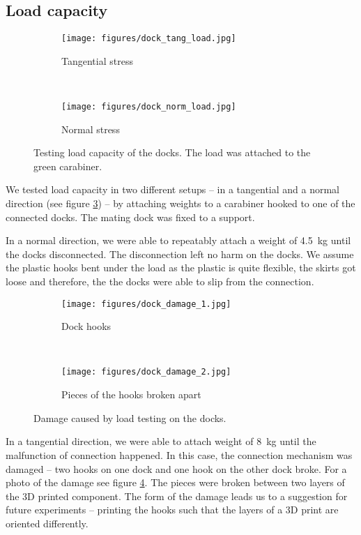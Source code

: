 \subsection{Load capacity}

\begin{figure}[t!]
    \centering
    \begin{subfigure}[b]{0.45\textwidth}
        \texttt{[image: figures/dock\_tang\_load.jpg]}
        \caption{Tangential stress}
        \label{fig:dock_test_tang}
    \end{subfigure}
    ~
    \begin{subfigure}[b]{0.45\textwidth}
        \texttt{[image: figures/dock\_norm\_load.jpg]}
        \caption{Normal stress}
        \label{fig:dock_test_norm}
    \end{subfigure}
    \caption{Testing load capacity of the docks. The load was attached to the
    green carabiner.}
    \label{fig:dock_test_load}
\end{figure}

We tested load capacity in two different setups -- in a tangential and a normal
direction (see figure \ref{fig:dock_test_load}) -- by attaching weights to a
carabiner hooked to one of the connected docks. The mating dock was fixed to a
support.

In a normal direction, we were able to repeatably attach a weight of 4.5~kg
until the docks disconnected. The disconnection left no harm on the docks. We
assume the plastic hooks bent under the load as the plastic is quite flexible,
the skirts got loose and therefore, the the docks were able to slip from the
connection.

\begin{figure}[t!]
    \centering
    \begin{subfigure}[b]{0.45\textwidth}
        \texttt{[image: figures/dock\_damage\_1.jpg]}
        \caption{Dock hooks}
    \end{subfigure}
    ~
    \begin{subfigure}[b]{0.45\textwidth}
        \texttt{[image: figures/dock\_damage\_2.jpg]}
        \caption{Pieces of the hooks broken apart}
    \end{subfigure}
    \caption{Damage caused by load testing on the docks.}
    \label{fig:dock_damage}
\end{figure}

In a tangential direction, we were able to attach weight of 8~kg until the
malfunction of connection happened. In this case, the connection mechanism was
damaged -- two hooks on one dock and one hook on the other dock broke. For a
photo of the damage see figure \ref{fig:dock_damage}. The pieces were broken
between two layers of the 3D printed component. The form of the damage leads us
to a suggestion for future experiments -- printing the hooks such that the
layers of a 3D print are oriented differently.


